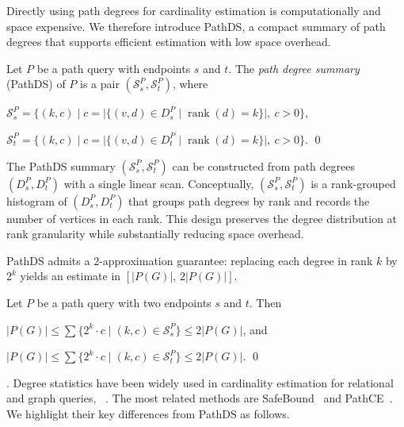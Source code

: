 Directly using path degrees for cardinality estimation is
computationally and space expensive. %
We therefore introduce PathDS, a compact summary of
path degrees that supports efficient estimation with low space
overhead.

\begin{definitionx}\label{def:pathds} %
Let $P$ be a path query with endpoints $s$ and $t$. The \emph{path
degree summary} (PathDS) of $P$ is a pair 
$(\mathcal{S}_s^P,\mathcal{S}_t^P)$, where 
\begin{mbi}%
\item $\mathcal{S}_s^P=\bigl\{(k,c)\mid
c=\lvert\{(v,d)\in D_s^P\mid
\operatorname{rank}(d){=}k\}\rvert,\ c>0\bigr\}$,
\item $\mathcal{S}_t^P=\bigl\{(k,c)\mid
c=\lvert\{(v,d)\in D_t^P\mid
\operatorname{rank}(d){=}k\}\rvert,\ c>0\bigr\}$. \qed{}
\end{mbi}
\end{definitionx}

\vspace{.25em}%
The PathDS summary $(\mathcal{S}_s^P,\mathcal{S}_t^P)$ can be
constructed from path degrees $(D_s^P, D_t^P)$ with a single linear
scan. %
Conceptually, $(\mathcal{S}_s^P,\mathcal{S}_t^P)$ is a rank-grouped
histogram of $(D_s^P, D_t^P)$ that groups path degrees by rank and
records the number of vertices in each rank. %
This design preserves the degree distribution at rank granularity while
substantially reducing space overhead.

\begin{example}
\end{example}

PathDS admits a $2$-approximation guarantee: replacing each degree in
rank $k$ by $2^k$ yields an estimate in $[|P(G)|,\,2|P(G)|]$.

\begin{propx} Let $P$ be a path query with two endpoints $s$ and $t$. Then
\begin{mbi}
\item $|P(G)| \leq \sum \{2^k
\cdot c \mid {(k,c)\in \mathcal{S}_s^P} \}\leq 2|P(G)|$, and 
\item $|P(G)| \leq \sum \{2^k
\cdot c \mid {(k,c)\in \mathcal{S}_t^P} \}\leq 2|P(G)|$. \qed
\end{mbi}
\end{propx}

. %
Degree statistics have been widely used in cardinality estimation for
relational and graph queries,
\eg~\cite{deedsSafeBoundPracticalSystem2023,
pathce,caiPessimisticCardinalityEstimation2019,glogs}. The most related
methods are SafeBound~\cite{deedsSafeBoundPracticalSystem2023} and
PathCE~\cite{pathce}. We highlight their key differences from PathDS as
follows.

